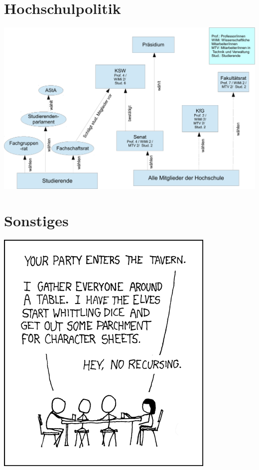 \documentclass[
  final,
  a4paper,              %
  style=screen,
  twoside,
  nexus,                %
  lnum,                 %
]{tubsartcl}
\begin{document}
	\section{Hochschulpolitik}
		\label{politik}
		\begin{minipage}[H]{1.0\linewidth}
		\begin{center}
			\centering
			\includegraphics[width=\textwidth]{bilder/gremienkunde/gremienkunde3}
		\end{center}
		\end{minipage}
		\vspace{0.5cm}
		\begin{multicols}{2}
		\raggedcolumns
		
		
		\end{multicols}
	\newpage

	\section{Sonstiges}
		\label{sonstiges}
		\begin{multicols}{2}
		
		
		\end{multicols}
		\newpage
		
		\newpage
		

		\vfill
		\begin{center}
			\includegraphics[totalheight=10cm]{bilder/XKCD/tabletop_roleplaying}
		\end{center}
		\vfill
\end{document}
